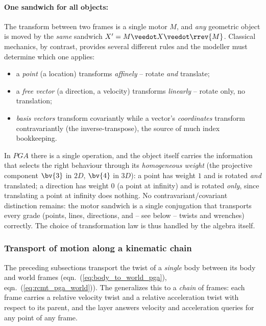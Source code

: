 \paragraph{One sandwich for all objects:} The transform between two frames is a single
motor $M$, and \emph{any} geometric object is
moved by the \emph{same} sandwich $X' = M \veedot X \veedot \rrev{M}$. Classical
mechanics, by contrast, provides several different rules and the modeller must determine
which one applies:
\begin{itemize}
    \item a \emph{point} (a location) transforms \emph{affinely} -- rotate \emph{and}
          translate;
    \item a \emph{free vector} (a direction, a velocity) transforms \emph{linearly} --
          rotate only, no translation;
    \item \emph{basis vectors} transform covariantly while a vector's \emph{coordinates}
          transform contravariantly (the inverse-transpose), the source of much index
          bookkeeping.
\end{itemize}
In $PGA$ there is a single operation, and the object itself carries the information that
selects the right behaviour through its \emph{homogeneous weight} (the projective
component $\bv{3}$ in $2D$, $\bv{4}$ in $3D$): a point has weight $1$ and is rotated
\emph{and} translated; a direction has weight $0$ (a point at infinity) and is rotated
\emph{only}, since translating a point at infinity does nothing. No
contravariant/covariant distinction remains: the motor sandwich is a single
conjugation that transports every grade (points, lines, directions, and --
see below -- twists and wrenches) correctly. The choice of transformation law is thus
handled by the algebra itself.


\subsubsection{Transport of motion along a kinematic chain}
\label{subsubsection:transport_along_chain}

The preceding subsections transport the twist of a \emph{single} body between its body and
world frames (eqn.~(\ref{eq:body_to_world_pga}), eqn.~(\ref{eq:rcmt_pga_world})). The
 generalizes this to a \emph{chain} of frames: each frame
carries a relative velocity twist and a relative acceleration twist with respect to its
parent, and the layer answers velocity and acceleration queries for any point of any
frame.

